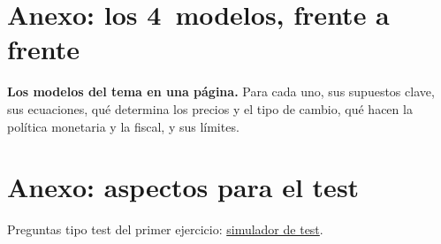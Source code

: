 \documentclass[11pt]{article}
\begin{document}
\clearpage
\section{Anexo: los 4~modelos, frente a frente}\label{anexo:comparacion}

\begin{anotaciones}
\textbf{Los modelos del tema en una página.} Para cada uno, sus supuestos clave, sus ecuaciones, qué determina los precios y el tipo de cambio, qué hacen la política monetaria y la fiscal, y sus límites.
\begin{infografiacaja}
\caption{IS-LM con OA-DA, IS-LM-BP con OA-DA, el modelo neokeynesiano canónico y la nueva macroeconomía abierta}\label{figu:comparacion-modelos}
\end{infografiacaja}
\end{anotaciones}

\section{Anexo: aspectos para el test}\label{anexo:test}

\begin{anotaciones}
Preguntas tipo test del primer ejercicio: \href{https://www.victorgutierrezmarcos.es/oposicion/temario/primer-ejercicio/test/simulador.html?tema=3.A.32}{simulador de test}.
\end{anotaciones}
\end{document}
